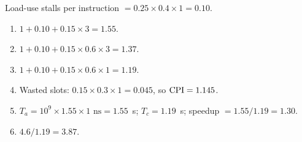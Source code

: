 \documentclass[11pt]{article}
\begin{document}
\begin{solution}[\ref{x:branches}]
Load-use stalls per instruction $= 0.25\times0.4\times1 = 0.10$.
\begin{enumerate}[label=(\alph*),leftmargin=*]
  \item $1 + 0.10 + 0.15\times3 = 1.55$.
  \item $1 + 0.10 + 0.15\times0.6\times3 = 1.37$.
  \item $1 + 0.10 + 0.15\times0.6\times1 = 1.19$.
  \item Wasted slots: $0.15\times0.3\times1 = 0.045$, so $\mathrm{CPI} = 1.145$.
  \item $T_a = 10^9\times1.55\times1\text{ ns} = 1.55$~s; $T_c = 1.19$~s;
  speedup $= 1.55/1.19 = 1.30$.
  \item $4.6/1.19 = 3.87$.
\end{enumerate}
\end{solution}
\end{document}
